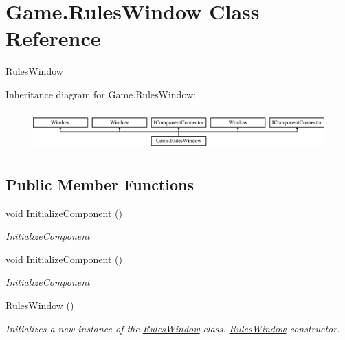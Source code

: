 \hypertarget{class_game_1_1_rules_window}{}\section{Game.\+Rules\+Window Class Reference}
\label{class_game_1_1_rules_window}


\mbox{\hyperlink{class_game_1_1_rules_window}{Rules\+Window}}  


Inheritance diagram for Game.\+Rules\+Window\+:\begin{figure}[H]
\begin{center}
\leavevmode
\includegraphics[height=1.544828cm]{class_game_1_1_rules_window}
\end{center}
\end{figure}
\subsection*{Public Member Functions}
\begin{DoxyCompactItemize}
\item 
void \mbox{\hyperlink{class_game_1_1_rules_window_a1aec29ee1681cac885a5f65300b51e5f}{Initialize\+Component}} ()
\begin{DoxyCompactList}\small\item\em Initialize\+Component \end{DoxyCompactList}\item 
void \mbox{\hyperlink{class_game_1_1_rules_window_a1aec29ee1681cac885a5f65300b51e5f}{Initialize\+Component}} ()
\begin{DoxyCompactList}\small\item\em Initialize\+Component \end{DoxyCompactList}\item 
\mbox{\hyperlink{class_game_1_1_rules_window_a39f6fce57d6796318fccc623a4ccfe4e}{Rules\+Window}} ()
\begin{DoxyCompactList}\small\item\em Initializes a new instance of the \mbox{\hyperlink{class_game_1_1_rules_window}{Rules\+Window}} class. \mbox{\hyperlink{class_game_1_1_rules_window}{Rules\+Window}} constructor. \end{DoxyCompactList}\end{DoxyCompactItemize}


